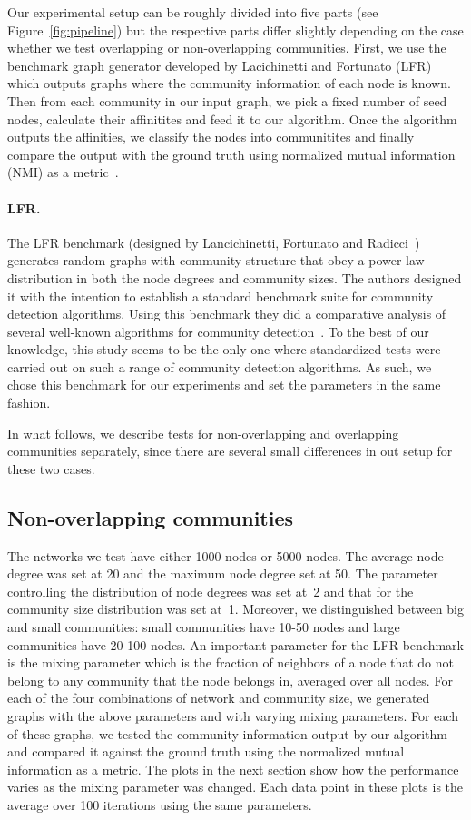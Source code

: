 Our experimental setup can be roughly divided into five parts (see Figure~\ref{fig:pipeline}) but the 
respective parts differ slightly depending on the case whether we test overlapping or non-overlapping 
communities. First, we use the benchmark graph generator developed by Lacichinetti and Fortunato 
(LFR)~\cite{LFR08, LF09} which outputs graphs where the community information of each node 
is known. Then from each community in our input graph, we pick a fixed number of seed nodes, 
calculate their affinitites and feed it to our algorithm. Once the algorithm outputs the 
affinities, we classify the nodes into communitites and finally compare the output 
with the ground truth using normalized mutual information (NMI) as a metric~\cite{DDDA05}.


\paragraph{LFR.}
The LFR benchmark (designed by Lancichinetti, Fortunato and Radicci~\cite{LFR08}) 
generates random graphs with community structure that obey a power law 
distribution in both the node degrees and community sizes. The authors designed it 
with the intention to establish a standard benchmark suite for community detection 
algorithms. Using this benchmark they did a comparative analysis of several well-known algorithms
for community detection~\cite{LF09}. To the best of our knowledge, this study seems to be the 
only one where standardized tests were carried out on such a range of community detection algorithms. 
As such, we chose this benchmark for our experiments and set the parameters in the same fashion. 

In what follows, we describe tests for non-overlapping and overlapping communities separately, since 
there are several small differences in out setup for these two cases. 

\subsection{Non-overlapping communities}
The networks we test have either 1000 nodes or 5000 nodes. The average node degree
was set at 20 and the maximum node degree set at 50. The parameter controlling the 
distribution of node degrees was set at~2 and that for the community size distribution was 
set at~1. Moreover, we distinguished between big and small communities: small communities have 
10-50 nodes and large communities have 20-100 nodes. An important parameter 
for the LFR benchmark is the mixing parameter which is the fraction of neighbors 
of a node that do not belong to any community that the node belongs in, averaged over all nodes.
For each of the four combinations of network and community size, we generated graphs with the 
above parameters and with varying mixing parameters. For each of these graphs, we tested the 
community information output by our algorithm and compared it against the ground truth 
using the normalized mutual information as a metric. The plots in the next section 
show how the performance varies as the mixing parameter was changed. Each data point in 
these plots is the average over 100 iterations using the same parameters. 

